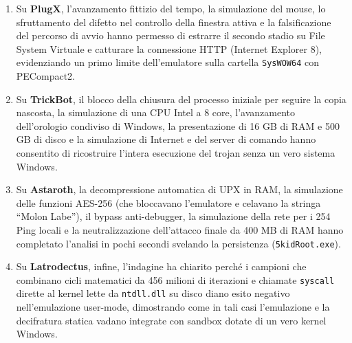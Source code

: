 \documentclass[11pt, a4paper]{article}
\begin{document}
	\begin{enumerate}
		\item Su \textbf{PlugX}, l'avanzamento fittizio del tempo, la simulazione del mouse, lo sfruttamento del difetto nel controllo della finestra attiva e la falsificazione del percorso di avvio hanno permesso di estrarre il secondo stadio su File System Virtuale e catturare la connessione HTTP (Internet Explorer 8), evidenziando un primo limite dell'emulatore sulla cartella \texttt{SysWOW64} con PECompact2.
		
		\item Su \textbf{TrickBot}, il blocco della chiusura del processo iniziale per seguire la copia nascosta, la simulazione di una CPU Intel a 8 core, l'avanzamento dell'orologio condiviso di Windows, la presentazione di 16 GB di RAM e 500 GB di disco e la simulazione di Internet e del server di comando hanno consentito di ricostruire l'intera esecuzione del trojan senza un vero sistema Windows.
		
		\item Su \textbf{Astaroth}, la decompressione automatica di UPX in RAM, la simulazione delle funzioni AES-256 (che bloccavano l'emulatore e celavano la stringa ``Molon Labe''), il bypass anti-debugger, la simulazione della rete per i 254 Ping locali e la neutralizzazione dell'attacco finale da 400 MB di RAM hanno completato l'analisi in pochi secondi svelando la persistenza (\texttt{5kidRoot.exe}).
		
		\item Su \textbf{Latrodectus}, infine, l'indagine ha chiarito perché i campioni che combinano cicli matematici da 456 milioni di iterazioni e chiamate \texttt{syscall} dirette al kernel lette da \texttt{ntdll.dll} su disco diano esito negativo nell'emulazione user-mode, dimostrando come in tali casi l'emulazione e la decifratura statica vadano integrate con sandbox dotate di un vero kernel Windows.
	\end{enumerate}
	
\end{document}

